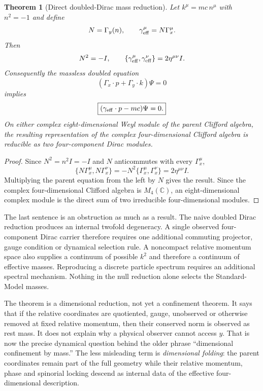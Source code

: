 \documentclass[11pt]{article}
\newtheorem{theorem}{Theorem}[section]
\theoremstyle{definition}\newtheorem{definition}[theorem]{Definition}
\theoremstyle{remark}\newtheorem{remark}[theorem]{Remark}\newtheorem{conjecture}[theorem]{Conjecture}
\begin{document}
\begin{theorem}[Direct doubled-Dirac mass reduction]\label{thm:doubleddirac}
Let $k^\mu=mc\,n^\mu$ with $n^2=-1$ and define
\begin{equation}
 N=\Gamma_y(n),\qquad
 \gamma_{\rm eff}^{\mu}=N\Gamma_x^\mu.
\end{equation}
Then
\begin{equation}
 N^2=-I,\qquad
 \{\gamma_{\rm eff}^{\mu},\gamma_{\rm eff}^{\nu}\}=2\eta^{\mu\nu}I.
\end{equation}
Consequently the massless doubled equation
\begin{equation}
 (\Gamma_x\cdot p+\Gamma_y\cdot k)\Psi=0
\end{equation}
implies
\begin{equation}
 \boxed{(\gamma_{\rm eff}\cdot p-mc)\Psi=0.}
\end{equation}
On either complex eight-dimensional Weyl module of the parent Clifford algebra, the resulting representation of the complex four-dimensional Clifford algebra is reducible as two four-component Dirac modules.
\end{theorem}
\begin{proof}
Since $N^2=n^2I=-I$ and $N$ anticommutes with every $\Gamma_x^\mu$,
\[
\{N\Gamma_x^\mu,N\Gamma_x^\nu\}
=-N^2\{\Gamma_x^\mu,\Gamma_x^\nu\}
=2\eta^{\mu\nu}I.
\]
Multiplying the parent equation from the left by $N$ gives the result. Since the complex four-dimensional Clifford algebra is $M_4(\mathbb C)$, an eight-dimensional complex module is the direct sum of two irreducible four-dimensional modules.
\end{proof}

The last sentence is an obstruction as much as a result. The naive doubled Dirac reduction produces an internal twofold degeneracy. A single observed four-component Dirac carrier therefore requires one additional commuting projector, gauge condition or dynamical selection rule. A noncompact relative momentum space also supplies a continuum of possible $k^2$ and therefore a continuum of effective masses. Reproducing a discrete particle spectrum requires an additional spectral mechanism. Nothing in the null reduction alone selects the Standard-Model masses.

The theorem is a dimensional reduction, not yet a confinement theorem. It says that if the relative coordinates are quotiented, gauge, unobserved or otherwise removed at fixed relative momentum, then their conserved norm is observed as rest mass. It does not explain why a physical observer cannot access $y$. That is now the precise dynamical question behind the older phrase ``dimensional confinement by mass.'' The less misleading term is \emph{dimensional folding}: the parent coordinates remain part of the full geometry while their relative momentum, phase and spinorial locking descend as internal data of the effective four-dimensional description.
\end{document}
